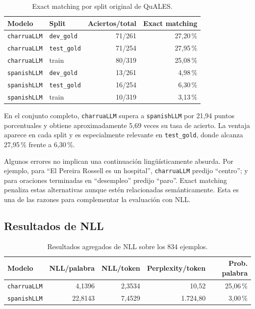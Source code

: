 \documentclass[11pt,a4paper]{article}
\newcommand{\charrua}{\texttt{charruaLLM}}
\newcommand{\spanishmodel}{\texttt{spanishLLM}}
\newcommand{\code}[1]{\texttt{#1}}
\begin{document}
\begin{table}[H]
    \centering
    \caption{Exact matching por split original de QuALES.}
    \label{tab:exact-split}
    \begin{tabular}{llrr}
        \toprule
        Modelo & Split & Aciertos/total & Exact matching \\
        \midrule
        \charrua & \code{dev\_gold} & 71/261 & 27,20\,\% \\
        \charrua & \code{test\_gold} & 71/254 & 27,95\,\% \\
        \charrua & train & 80/319 & 25,08\,\% \\
        \midrule
        \spanishmodel & \code{dev\_gold} & 13/261 & 4,98\,\% \\
        \spanishmodel & \code{test\_gold} & 16/254 & 6,30\,\% \\
        \spanishmodel & train & 10/319 & 3,13\,\% \\
        \bottomrule
    \end{tabular}
\end{table}

En el conjunto completo, \charrua{} supera a \spanishmodel{} por 21,94 puntos
porcentuales y obtiene aproximadamente 5,69 veces su tasa de acierto. La
ventaja aparece en cada split y es especialmente relevante en
\code{test\_gold}, donde alcanza 27,95\,\% frente a 6,30\,\%.

Algunos errores no implican una continuación lingüísticamente absurda. Por
ejemplo, para ``El Pereira Rossell es un hospital'', \charrua{} predijo
``centro''; y para oraciones terminadas en ``desempleo'' predijo ``paro''.
Exact matching penaliza estas alternativas aunque estén relacionadas
semánticamente. Esta es una de las razones para complementar la evaluación con
NLL.


\subsection{Resultados de NLL}

\begin{table}[H]
    \centering
    \small
    \caption{Resultados agregados de NLL sobre los 834 ejemplos.}
    \label{tab:nll-global}
    \begin{tabular}{lrrrr}
        \toprule
        Modelo & NLL/palabra & NLL/token & Perplexity/token & Prob. palabra \\
        \midrule
        \charrua & 4,1396 & 2,3534 & 10,52 & 25,06\,\% \\
        \spanishmodel & 22,8143 & 7,4529 & 1.724,80 & 3,00\,\% \\
        \bottomrule
    \end{tabular}
\end{table}
\end{document}
